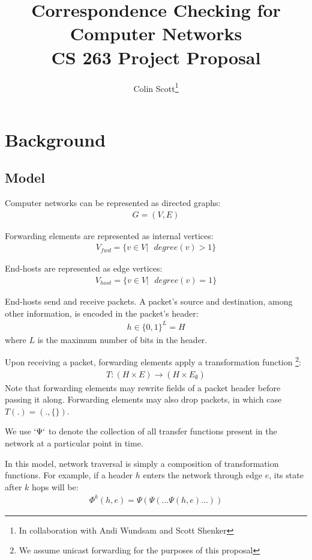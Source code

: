 \documentclass{sig-alternate-10pt}
\title{Correspondence Checking for Computer Networks \\
\Large{CS 263 Project Proposal \vspace{-25pt}}}
\author{Colin Scott\thanks{In collaboration with Andi
Wundsam and Scott Shenker}\vspace{-15pt}}
\date{}
\begin{document}
    \maketitle
    \thispagestyle{empty}
\section{Background}

\subsection{Model}

Computer networks can be represented as directed graphs:
\begin{align*}
G = (V, E)
\end{align*}

Forwarding elements are represented as internal vertices:
\begin{align*}
V_{fwd} = \{ v \in V |\text{ } degree(v) > 1 \}
\end{align*}

End-hosts are represented as edge vertices:
\begin{align*}
V_{host} = \{ v \in V |\text{ } degree(v) = 1 \}
\end{align*}

End-hosts send and receive packets. A packet's source and destination,
among other information, is encoded in the packet's header:
\begin{align*}
h \in \{0,1\}^L = H
\end{align*}
where $L$ is the maximum number of bits in
the header.

Upon receiving a packet, forwarding elements apply a transformation function
\footnote{We assume unicast forwarding for the purposes of this proposal}:
\begin{align*}
T: (H \times E) \rightarrow (H \times E_{\emptyset})
\end{align*}
Note that forwarding elements may rewrite fields of a packet header before passing it along.
Forwarding elements may also drop packets, in which case $T(.) = (.,\{\})$.

We use $`\Psi`$ to denote the collection of all transfer functions present in
the network at a particular point in time.

In this model, network traversal is simply a composition of transformation
functions. For example, if a header $h$ enters the network through edge
$e$, its state after $k$ hops will be:
\begin{align*}
\Phi^k(h,e) = \Psi(\Psi(\dots \Psi(h,e)\dots))
\end{align*}
\end{document}
